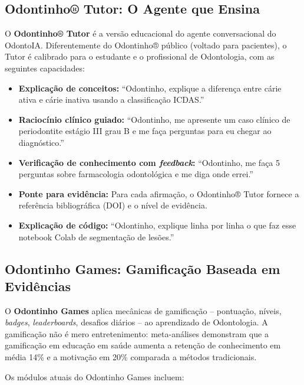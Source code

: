  

\subsection{Odontinho® Tutor: O Agente que Ensina}

O \textbf{Odontinho® Tutor} é a versão educacional do agente conversacional do
OdontoIA. Diferentemente do Odontinho® público (voltado para pacientes), o Tutor
é calibrado para o estudante e o profissional de Odontologia, com as seguintes
capacidades:

\begin{itemize}
  \item \textbf{Explicação de conceitos:} ``Odontinho, explique a diferença
    entre cárie ativa e cárie inativa usando a classificação ICDAS.''
  \item \textbf{Raciocínio clínico guiado:} ``Odontinho, me apresente um caso
    clínico de periodontite estágio III grau B e me faça perguntas para eu
    chegar ao diagnóstico.''
  \item \textbf{Verificação de conhecimento com \textit{feedback}:} ``Odontinho,
    me faça 5 perguntas sobre farmacologia odontológica e me diga onde errei.''
  \item \textbf{Ponte para evidência:} Para cada afirmação, o Odontinho® Tutor
    fornece a referência bibliográfica (DOI) e o nível de evidência.
  \item \textbf{Explicação de código:} ``Odontinho, explique linha por linha o
    que faz esse notebook Colab de segmentação de lesões.''
\end{itemize}

\subsection{Odontinho Games: Gamificação Baseada em Evidências}

O \textbf{Odontinho Games} aplica mecânicas de gamificação -- pontuação, níveis,
\textit{badges}, \textit{leaderboards}, desafios diários -- ao aprendizado de
Odontologia. A gamificação não é mero entretenimento: meta-análises demonstram
que a gamificação em educação em saúde aumenta a retenção de conhecimento em
média 14\% e a motivação em 20\% comparada a métodos tradicionais.

Os módulos atuais do Odontinho Games incluem:

